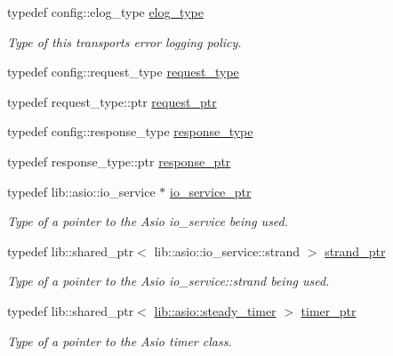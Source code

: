 \begin{DoxyCompactItemize}
typedef config\+::elog\+\_\+type \hyperlink{classwebsocketpp_1_1transport_1_1asio_1_1connection_a1d2ac8c55817ecadf12be51f49578ca5}{elog\+\_\+type}
\begin{DoxyCompactList}\small\item\em Type of this transport\textquotesingle{}s error logging policy. \end{DoxyCompactList}\item 
typedef config\+::request\+\_\+type \hyperlink{classwebsocketpp_1_1transport_1_1asio_1_1connection_abe1fcb3f42039ea64c0fd3bf42b7c026}{request\+\_\+type}
\item 
typedef request\+\_\+type\+::ptr \hyperlink{classwebsocketpp_1_1transport_1_1asio_1_1connection_a3580e74fb64d30d32f9cac3af47e4954}{request\+\_\+ptr}
\item 
typedef config\+::response\+\_\+type \hyperlink{classwebsocketpp_1_1transport_1_1asio_1_1connection_a493602c4469c407f3a94edf71ed9705e}{response\+\_\+type}
\item 
typedef response\+\_\+type\+::ptr \hyperlink{classwebsocketpp_1_1transport_1_1asio_1_1connection_a2ff953856756493592411577bb4640d2}{response\+\_\+ptr}
\item 
typedef lib\+::asio\+::io\+\_\+service $\ast$ \hyperlink{classwebsocketpp_1_1transport_1_1asio_1_1connection_a8a0bff59326cab2996e414d32f627232}{io\+\_\+service\+\_\+ptr}
\begin{DoxyCompactList}\small\item\em Type of a pointer to the Asio io\+\_\+service being used. \end{DoxyCompactList}\item 
typedef lib\+::shared\+\_\+ptr$<$ lib\+::asio\+::io\+\_\+service\+::strand $>$ \hyperlink{classwebsocketpp_1_1transport_1_1asio_1_1connection_ad960008bc6449e5c74e041d21a5c05e4}{strand\+\_\+ptr}
\begin{DoxyCompactList}\small\item\em Type of a pointer to the Asio io\+\_\+service\+::strand being used. \end{DoxyCompactList}\item 
typedef lib\+::shared\+\_\+ptr$<$ \hyperlink{namespacewebsocketpp_1_1lib_1_1asio_a156f3dad489fb17e3bc79d2009d2656f}{lib\+::asio\+::steady\+\_\+timer} $>$ \hyperlink{classwebsocketpp_1_1transport_1_1asio_1_1connection_a96d8a6cd5cf1120208b206da109a194e}{timer\+\_\+ptr}
\begin{DoxyCompactList}\small\item\em Type of a pointer to the Asio timer class. \end{DoxyCompactList}\end{DoxyCompactItemize}
